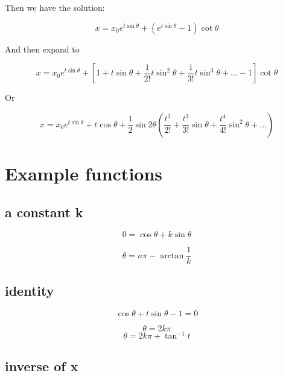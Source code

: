 \documentclass{article}
\begin{document}
Then we have the solution:

\begin{equation}
   x =  x_0 e^{t \sin \theta} + (e^{t \sin \theta} - 1) \cot \theta
\end{equation}

And then expand to

\begin{equation}
   x =  x_0 e^{t \sin \theta} + [1 + t \sin \theta + \frac{1}{2!} t\sin^2 \theta  + \frac{1}{3!} t \sin^3 \theta + ... - 1] \cot \theta
\end{equation}

Or

\begin{equation}
   x =  x_0 e^{t \sin \theta} + t \cos \theta + \frac{1}{2} \sin 2\theta (\frac{t^2}{2!} + \frac{t^3}{3!} \sin \theta + \frac{t^4}{4!} \sin^2 \theta + ...)
\end{equation}

\section{Example functions}\label{sec:ef}

\subsection{a constant k}

\begin{equation}
    0 = \cos \theta + k \sin \theta
\end{equation}

\begin{equation}
    \theta = n\pi - \arctan \frac{1}{k}
\end{equation}

\subsection{identity}

\begin{equation}
    \cos \theta + t \sin \theta - 1 = 0
\end{equation}

\begin{equation}
    \theta = 2k\pi
\end{equation}
\begin{equation}
    \theta = 2k\pi + \tan^{-1} t
\end{equation}

\subsection{inverse of x}
\end{document}
